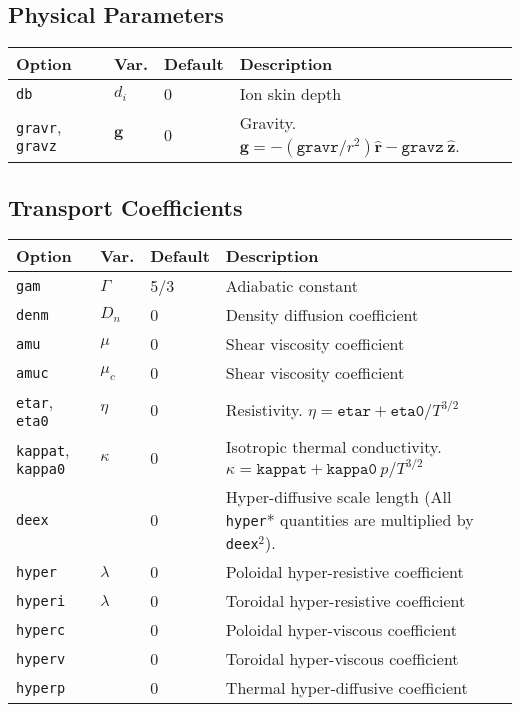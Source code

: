 \documentclass[letterpaper]{book}
\renewcommand{\vec}[1]{\ensuremath{\mathbf{#1}}}
\newcommand{\uvec}[1]{\ensuremath{\vec{\hat{#1}}}}
\begin{document}
\subsection{Physical Parameters}

\begin{tabular}{llll}
  \textbf{Option}&\textbf{Var.}&\textbf{Default}&\textbf{Description}\\
  \hline
  \texttt{db}     & $d_i$   & 0   & Ion skin depth\\
  \texttt{gravr}, \texttt{gravz} & \vec{g} & 0 & \parbox[t]{1.8in}{Gravity.\\
                       $\vec{g} = -(\mathtt{gravr}/r^2) \uvec{r} 
                                  - \mathtt{gravz}\ \uvec{z}$.}
\end{tabular}


\subsection{Transport Coefficients}

\begin{tabular}{llll}
  \textbf{Option}&\textbf{Var.}&\textbf{Default}&\textbf{Description}\\
  \hline
  \texttt{gam}    & $\Gamma$& 5/3 & Adiabatic constant\\
  \texttt{denm}   & $D_n$   & 0   & Density diffusion coefficient\\
  \texttt{amu}    & $\mu$   & 0   & Shear viscosity coefficient\\
  \texttt{amuc}   & $\mu_c$ & 0   & Shear viscosity coefficient\\
  \texttt{etar}, \texttt{eta0}
                  & $\eta$  & 0   & Resistivity.  
                  $\eta = \mathtt{etar} + \mathtt{eta0}/T^{3/2}$\\
  \texttt{kappat}, \texttt{kappa0}
                  & $\kappa$& 0   &  \parbox[t]{1.9in}
	          {Isotropic thermal conductivity.\\
                  $\kappa = \mathtt{kappat} + \mathtt{kappa0}\ p/T^{3/2}$}\\
  \texttt{deex}   & & 0 & \parbox[t]{1.9in}{Hyper-diffusive scale length\\
    (All \texttt{hyper}* quantities are multiplied by \texttt{deex}$^2$).}\\
  \texttt{hyper}  & $\lambda$ & 0 & Poloidal hyper-resistive coefficient\\
  \texttt{hyperi} & $\lambda$ & 0 & Toroidal hyper-resistive coefficient\\
  \texttt{hyperc} & & 0 & Poloidal hyper-viscous coefficient\\
  \texttt{hyperv} & & 0 & Toroidal hyper-viscous coefficient\\
  \texttt{hyperp} & & 0 & Thermal hyper-diffusive coefficient\\
\end{tabular}
\end{document}
